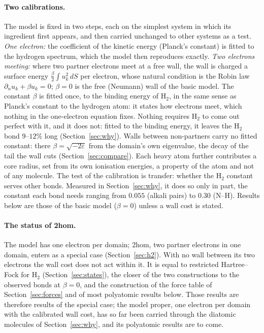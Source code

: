 \documentclass[11pt]{article}
\begin{document}
\paragraph{Two calibrations.} The model is fixed in two steps, each on the simplest system in which its
ingredient first appears, and then carried unchanged to other systems as a test. \emph{One electron:} the
coefficient of the kinetic energy (Planck's constant) is fitted to the hydrogen spectrum, which the model
then reproduces exactly. \emph{Two electrons meeting:} where two partner electrons meet at a free
wall, the wall is charged a surface energy $\tfrac{\beta}{2}\int u_k^2\,dS$ per electron, whose natural
condition is the Robin law $\partial_n u_k + \beta u_k = 0$; $\beta = 0$ is the free (Neumann) wall of the
basic model. The constant $\beta$ is fitted once, to the binding energy of H$_2$, in the same sense as
Planck's constant to the hydrogen atom: it states how electrons meet, which nothing in the one-electron
equation fixes. Nothing requires H$_2$ to come out perfect with it, and it does not: fitted to the binding
energy, it leaves the H$_2$ bond $9$--$12\%$ long (Section~\ref{sec:why}). Walls between non-partners
carry no fitted constant: there $\beta = \sqrt{-2\varepsilon}$ from the domain's own eigenvalue, the decay of
the tail the wall cuts (Section~\ref{sec:compare}). Each heavy atom further contributes a core radius, set
from its own ionisation energies, a property of the atom and not of any molecule. The test of the
calibration is transfer: whether the H$_2$ constant serves other bonds. Measured in
Section~\ref{sec:why}, it does so only in part, the constant each bond needs ranging from $0.055$ (alkali
pairs) to $0.30$ (N--H). Results below are those of the basic model ($\beta = 0$) unless a wall cost is stated.

\paragraph{The status of 2hom.} The model has one electron per domain; 2hom, two partner electrons in
one domain, enters as a special case (Section~\ref{sec:h2}). With no wall between its two electrons the wall
cost does not act within it. It is equal to restricted Hartree--Fock for H$_2$ (Section~\ref{sec:states}), the
closer of the two constructions to the observed bonds at $\beta = 0$, and the construction of the force table
of Section~\ref{sec:forces} and of most polyatomic results below. Those results are therefore results of the
special case; the model proper, one electron per domain with the calibrated wall cost, has so far been
carried through the diatomic molecules of Section~\ref{sec:why}, and its polyatomic results are to come.
\end{document}

